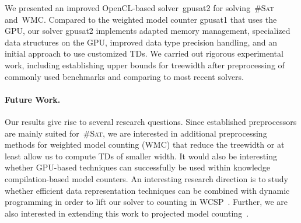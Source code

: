 \documentclass{llncs}
\newcommand{\cSAT}{\textsc{\#Sat}\xspace}%
\newcommand{\WMC}{\textsc{WMC}\xspace}%
\newcommand{\gpusatnu}{{\small\textsf{gpusat2}}\xspace}
\newcommand{\gpusatone}{{\small\textsf{gpusat1}}\xspace}
\begin{document}
%

%


%


We presented an improved OpenCL-based solver~\gpusatnu for
solving~\cSAT and~\WMC.  Compared to the weighted model counter
\gpusatone that uses the GPU, our solver \gpusatnu implements adapted
memory management, specialized data structures on the GPU, improved
data type precision handling, and an initial approach to use
customized TDs.
%
We carried out rigorous experimental work, including establishing
upper bounds for treewidth after preprocessing of commonly used
benchmarks and comparing to most recent solvers.
%
%

\paragraph{Future Work.}
Our results give rise to several research questions.
Since established preprocessors are mainly suited for~\cSAT, we are
interested in additional preprocessing methods for weighted model
counting (WMC) that reduce the treewidth or at least allow us to
compute TDs of smaller width.
%
It would also be interesting whether GPU-based techniques can
successfully be used within knowledge compilation-based model
counters.
%
An interesting research direction is to study whether
efficient data representation techniques can be combined with dynamic
programming in order to lift our solver to
%
%
counting in WCSP~\cite{FiorettoPontelliYeoh18}.
Further, we are also interested in extending this work to projected
model counting~\cite{FichteEtAl18d,FichteHecher19,FichteHecherMeier19}.
%
%
%

%


%
\end{document}
